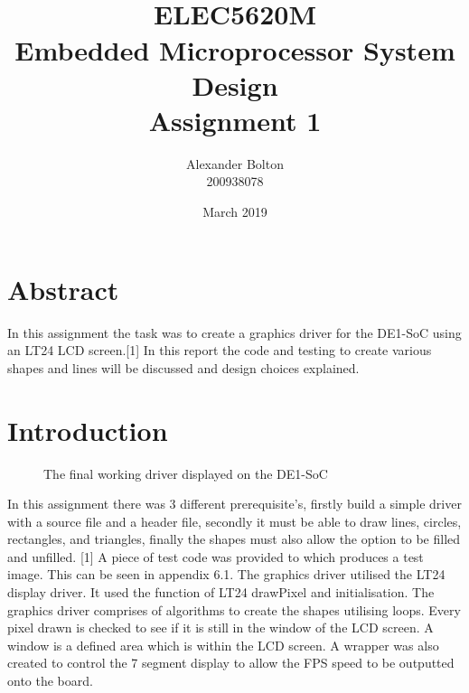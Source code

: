 \documentclass[a4paper,12pt]{article}
\begin{document}
\title{\\ \textbf{ELEC5620M \\ Embedded Microprocessor System Design \\ Assignment 1}}
\author{Alexander Bolton \\ 200938078}
\date{March 2019}
\maketitle
\section{Abstract}
In this assignment the task was to create a graphics driver for the DE1-SoC using an LT24 LCD screen.[1] In this report the code and testing to create various shapes and lines will be discussed and design choices explained.
\newpage

\tableofcontents
\newpage

\section{Introduction}
\begin{figure}[h]
	\centering
	\caption{The final working driver displayed on the DE1-SoC}
\end{figure}

\begin{flushleft}
In this assignment there was 3 different prerequisite's, firstly build a simple driver with a source file and a header file, secondly it must be able to draw lines, circles, rectangles, and triangles, finally the shapes must also allow the option to be filled and unfilled. [1] A piece of test code was provided to which produces a test image. This can be seen in appendix 6.1. 
\newline
\newline
The graphics driver utilised the LT24 display driver. It used the function of LT24 drawPixel and initialisation. The graphics driver comprises of algorithms to create the shapes utilising loops. Every pixel drawn is checked to see if it is still in the window of the LCD screen. A window is a defined area which is within the LCD screen. A wrapper was also created to control the 7 segment display to allow the FPS speed to be outputted onto the board.
\end{flushleft}
\end{document}

